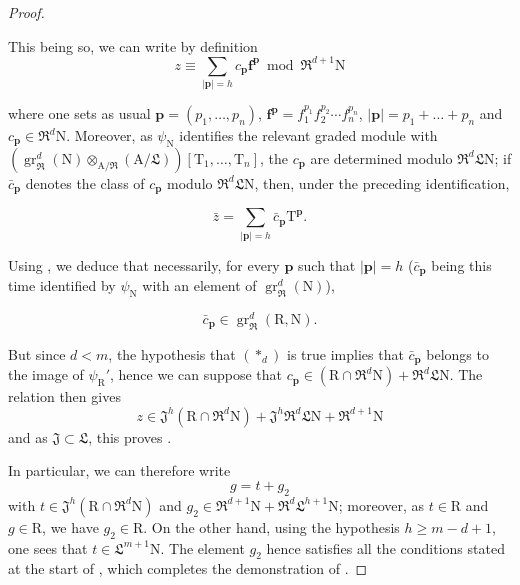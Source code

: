 \begin{proof}
\begin{env}[19.7.1.21]
\label{IV.19.7.1.21}
This being so, we can write by definition
\[
  z\equiv\textstyle\sum_{|\mathbf{p}|=h}c_\mathbf{p}\mathbf{f}^\mathbf{p}\bmod{\mathfrak{R}^{d+1}\mathrm{N}}
\]
\end{env}
where one sets as usual $\mathbf{p}=(p_1,\ldots,p_n)$, $\mathbf{f}^\mathbf{p}=f_1^{p_1}f_2^{p_2}\cdots f_n^{p_n}$, $|\mathbf{p}|=p_1+\ldots+p_n$ and $c_\mathbf{p}\in\mathfrak{R}^d\mathrm{N}$. Moreover, as $\psi_\mathrm{N}$ identifies the relevant graded module with $(\operatorname{gr}_\mathfrak{R}^d(\mathrm{N})\otimes_{\mathrm{A}/\mathfrak{R}}(\mathrm{A}/\mathfrak{L}))[\mathrm{T}_1,\ldots,\mathrm{T}_n]$, the $c_\mathbf{p}$ are determined modulo $\mathfrak{R}^d\mathfrak{L}\mathrm{N}$; if $\bar c_\mathbf{p}$ denotes the class of $c_\mathbf{p}$ modulo $\mathfrak{R}^d\mathfrak{L}\mathrm{N}$, then, under the preceding identification,
\begin{env}[19.7.1.22]
\label{IV.19.7.1.22}
\[
  \bar{z}=\textstyle\sum_{|\mathbf{p}|=h}\bar{c}_\mathbf{p}\mathrm{T}^\mathbf{p}.
\]
\end{env}
Using , we deduce that necessarily, for every $\mathbf{p}$ such that $|\mathbf{p}|=h$ ($\bar{c}_\mathbf{p}$ being this time identified by $\psi_\mathrm{N}$ with an element of $\operatorname{gr}_\mathfrak{R}^d(\mathrm{N})$),
\begin{env}[19.7.1.23]
\label{IV.19.7.1.23}
\[
  \bar{c}_\mathbf{p}\in\operatorname{gr}_\mathfrak{R}^d(\mathrm{R},\mathrm{N}).
\]
\end{env}

But since $d<m$, the hypothesis that $(*_d)$ is true implies that $\bar{c}_\mathbf{p}$ belongs to the image of $\psi_\mathrm{R}'$, hence we can suppose that $c_\mathbf{p}\in(\mathrm{R}\cap\mathfrak{R}^d\mathrm{N})+\mathfrak{R}^d\mathfrak{L}\mathrm{N}$. The relation  then gives
\[
  z\in\mathfrak{J}^h(\mathrm{R}\cap\mathfrak{R}^d\mathrm{N})+\mathfrak{J}^h\mathfrak{R}^d\mathfrak{L}\mathrm{N}+\mathfrak{R}^{d+1}\mathrm{N}
\]
and as $\mathfrak{J}\subset\mathfrak{L}$, this proves .

In particular, we can therefore write
\[
  g=t+g_2
\]
with $t\in\mathfrak{J}^h(\mathrm{R}\cap\mathfrak{R}^d\mathrm{N})$ and $g_2\in\mathfrak{R}^{d+1}\mathrm{N}+\mathfrak{R}^d\mathfrak{L}^{h+1}\mathrm{N}$; moreover, as $t\in\mathrm{R}$ and $g\in\mathrm{R}$, we have $g_2\in\mathrm{R}$. On the other hand, using the hypothesis $h\geqslant m-d+1$, one sees that $t\in\mathfrak{L}^{m+1}\mathrm{N}$. The element $g_2$ hence satisfies all the conditions stated at the start of , which completes the demonstration of .
\end{proof}


